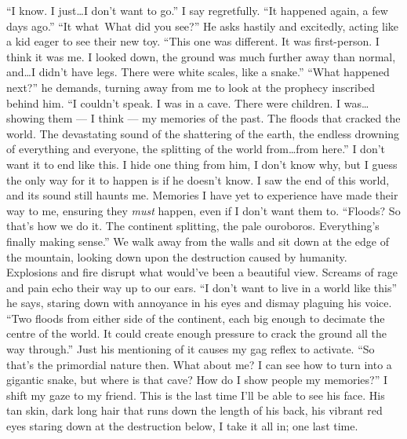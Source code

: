 \documentclass[openany, 12pt]{book}
\newcommand\tab[1][1cm]{\hspace*{#1}}
\begin{document}
\newline
\tab
``I know. I just\ldots  I don't want to go.'' I say regretfully. ``It happened again, a few days ago.''
\newline
\tab
``It what\textinterrobang\, What did you see?'' He asks hastily and excitedly, acting like a kid eager to see their new toy.
\newline
\tab
``This one was different. It was first-person. I think it was me. I looked down, the ground was much further away than normal, and\ldots I didn't have legs. There were white scales, like a snake.''
\newline
\tab
``What happened next?'' he demands, turning away from me to look at the prophecy inscribed behind him.
\newline
\tab
``I couldn't speak. I was in a cave. There were children. I was\ldots showing them --- I think --- my memories of the past. The floods that cracked the world. The devastating sound of the shattering of the earth, the endless drowning of everything and everyone, the splitting of the world from\ldots from here.'' I don't want it to end like this. I hide one thing from him, I don't know why, but I guess the only way for it to happen is if he doesn't know.
\newline
\tab
I saw the end of this world, and its sound still haunts me. Memories I have yet to experience have made their way to me, ensuring they \textit{must} happen, even if I don't want them to.
\newline
\tab
``Floods? So that's how we do it. The continent splitting, the pale ouroboros. Everything's finally making sense.''
\newline
\tab
We walk away from the walls and sit down at the edge of the mountain, looking down upon the destruction caused by humanity. Explosions and fire disrupt what would've been a beautiful view. Screams of rage and pain echo their way up to our ears. 
\newline
\tab
``I don't want to live in a world like this'' he says, staring down with annoyance in his eyes and dismay plaguing his voice. ``Two floods from either side of the continent, each big enough to decimate the centre of the world. It could create enough pressure to crack the ground all the way through.'' Just his mentioning of it causes my gag reflex to activate.
\newline
\tab
``So that's the primordial nature then. What about me? I can see how to turn into a gigantic snake, but where is that cave? How do I show people my memories?'' I shift my gaze to my friend. This is the last time I'll be able to see his face. His tan skin, dark long hair that runs down the length of his back, his vibrant red eyes staring down at the destruction below, I take it all in; one last time.
\end{document}
